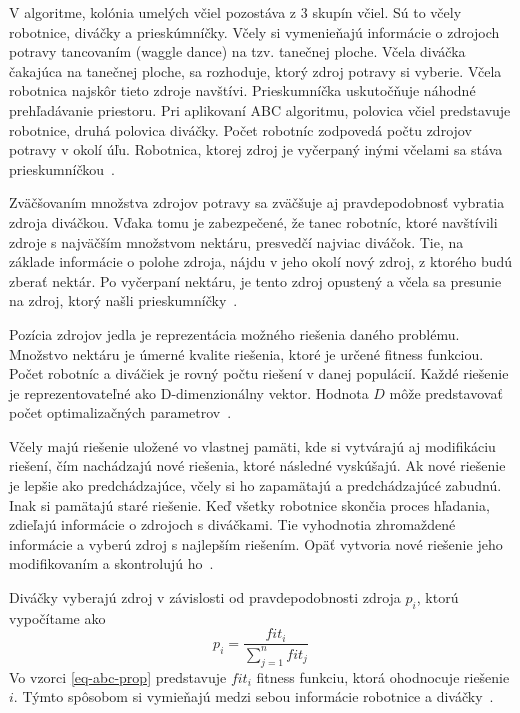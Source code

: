 \documentclass[a4paper,slovak,12pt,appendix]{article}
\begin{document}
V algoritme, kolónia umelých včiel pozostáva z 3 skupín včiel. Sú to včely
robotnice, diváčky a prieskúmníčky. Včely si vymenieňajú informácie o zdrojoch
potravy tancovaním (waggle dance) na tzv. tanečnej ploche. Včela diváčka
čakajúca na tanečnej ploche, sa rozhoduje, ktorý zdroj potravy si vyberie.
Včela robotnica najskôr tieto zdroje navštívi. Prieskumníčka uskutočňuje
náhodné prehľadávanie priestoru. Pri aplikovaní ABC algoritmu, polovica včiel
predstavuje robotnice, druhá polovica diváčky. Počet robotníc zodpovedá počtu
zdrojov potravy v okolí úľu. Robotnica, ktorej zdroj je vyčerpaný inými
včelami sa stáva prieskumníčkou~\cite{Karaboga2007}.

Zväčšovaním množstva zdrojov potravy sa zväčšuje aj pravdepodobnosť vybratia
zdroja diváčkou. Vďaka tomu je zabezpečené, že tanec robotníc, ktoré navštívili
zdroje s najväčším množstvom nektáru, presvedčí najviac diváčok. Tie,
na základe informácie o polohe zdroja, nájdu v jeho okolí nový zdroj, z ktorého
budú zberať nektár. Po vyčerpaní nektáru, je tento zdroj opustený a včela sa
presunie na zdroj, ktorý našli prieskumníčky~\cite{Karaboga2007}.

Pozícia zdrojov jedla je reprezentácia možného riešenia daného problému.
Množstvo nektáru je úmerné kvalite riešenia, ktoré je určené fitness funkciou.
Počet robotníc a diváčiek je rovný počtu riešení v danej populácií. Každé
riešenie je reprezentovateľné ako D-dimenzionálny vektor. Hodnota $D$ môže
predstavovať počet optimalizačných parametrov~\cite{Karaboga2007}.

Včely majú riešenie uložené vo vlastnej pamäti, kde si vytvárajú aj modifikáciu
riešení, čím nachádzajú nové riešenia, ktoré následné vyskúšajú. Ak nové
riešenie je lepšie ako predchádzajúce, včely si ho zapamätajú a predchádzajúcé
zabudnú. Inak si pamätajú staré riešenie. Keď všetky robotnice skončia proces
hľadania, zdieľajú informácie o zdrojoch s diváčkami. Tie vyhodnotia
zhromaždené informácie a vyberú zdroj s najlepším riešením. Opäť vytvoria nové
riešenie jeho modifikovaním a skontrolujú ho~\cite{Karaboga2007}.

Diváčky vyberajú zdroj v závislosti od pravdepodobnosti zdroja $p_i$,
ktorú vypočítame ako
\begin{equation}
  p_i = \frac{fit_i}{\sum_{j = 1}^{n} fit_j}
  \label{eq-abc-prop}
\end{equation}
Vo vzorci \ref{eq-abc-prop} predstavuje $fit_i$ fitness funkciu, ktorá
ohodnocuje riešenie $i$. Týmto spôsobom si vymieňajú medzi sebou informácie
robotnice a diváčky~\cite{Karaboga2007}.
\end{document}
